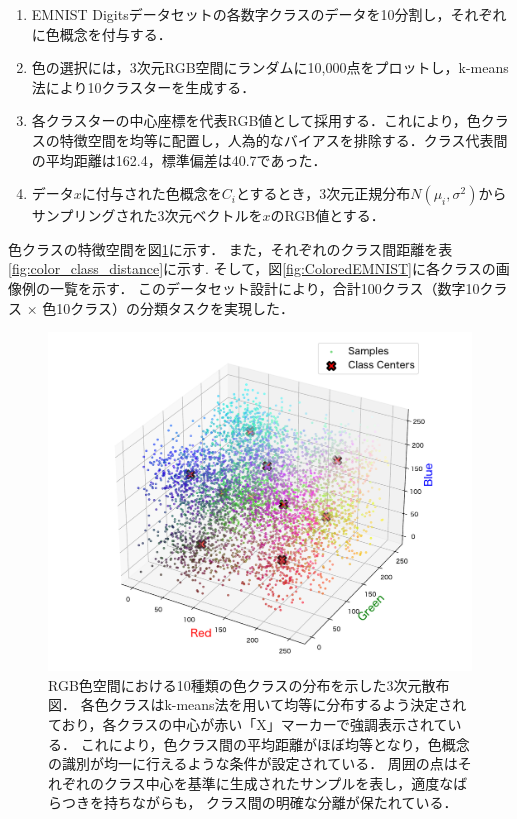 \begin{enumerate}
    \item EMNIST Digitsデータセットの各数字クラスのデータを10分割し，それぞれに色概念を付与する．
    \item 色の選択には，3次元RGB空間にランダムに10,000点をプロットし，k-means法により10クラスターを生成する．
    \item 各クラスターの中心座標を代表RGB値として採用する．これにより，色クラスの特徴空間を均等に配置し，人為的なバイアスを排除する．クラス代表間の平均距離は162.4，標準偏差は40.7であった．
    \item データ$x$に付与された色概念を$C_i$とするとき，3次元正規分布$N(\mu_i, \sigma^2)$からサンプリングされた3次元ベクトルを$x$のRGB値とする．
\end{enumerate}
色クラスの特徴空間を図\ref{fig:DistributionColors}に示す．
また，それぞれのクラス間距離を表\ref{fig:color_class_distance}に示す.
そして，図\ref{fig:ColoredEMNIST}に各クラスの画像例の一覧を示す．
このデータセット設計により，合計100クラス（数字10クラス × 色10クラス）の分類タスクを実現した．

\begin{figure}[H]
    \centering
    \includegraphics[width=1\columnwidth]{fig/DistributionColors.pdf}
    \caption[RGB色空間における10種類の色クラスの分布を示した3次元散布図]{
        RGB色空間における10種類の色クラスの分布を示した3次元散布図．
        各色クラスはk-means法を用いて均等に分布するよう決定されており，各クラスの中心が赤い「X」マーカーで強調表示されている．
        これにより，色クラス間の平均距離がほぼ均等となり，色概念の識別が均一に行えるような条件が設定されている．
        周囲の点はそれぞれのクラス中心を基準に生成されたサンプルを表し，適度なばらつきを持ちながらも，
        クラス間の明確な分離が保たれている．
    }
    \label{fig:DistributionColors}
\end{figure}

